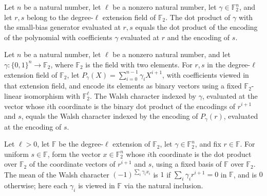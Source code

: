 \begin{theorem}
\leanok
{}
Let $n$ be a natural number, let $\ell$ be a nonzero natural number, let
$\gamma\in\mathbb F_2^n$, and let $r,s$ belong to the degree-$\ell$ extension field of
$\mathbb F_2$. The dot product of $\gamma$ with the small-bias generator evaluated at
$r,s$ equals the dot product of the encoding of the polynomial with coefficients
$\gamma$ evaluated at $r$ and the encoding of $s$.
\end{theorem}

\begin{theorem}
\label{FABL.vectorWalshCharacter_smallBiasGenerator}
\leanok
{}
Let $n$ be a natural number, let $\ell$ be a nonzero natural number, and let
$\gamma\colon \{0,1\}^n\to\mathbb F_2$, where $\mathbb F_2$ is the field with two
elements. For $r,s$ in the degree-$\ell$ extension field of $\mathbb F_2$, let
$P_\gamma(X)=\sum_{i=0}^{n-1}\gamma_iX^{i+1}$, with coefficients viewed in that
extension field, and encode its elements as binary vectors using a fixed $\mathbb
F_2$-linear isomorphism with $\mathbb F_2^\ell$. The Walsh character indexed by
$\gamma$, evaluated at the vector whose $i$th coordinate is the binary dot product of
the encodings of $r^{i+1}$ and $s$, equals the Walsh character indexed by the encoding
of $P_\gamma(r)$, evaluated at the encoding of $s$.
\end{theorem}

\begin{theorem}
\label{FABL.expect_smallBiasGenerator_fixed_first}
\leanok
{}
Let $\ell>0$, let $\mathbb{F}$ be the degree-$\ell$ extension of $\mathbb{F}_2$, let
$\gamma\in\mathbb{F}_2^n$, and fix $r\in\mathbb{F}$. For uniform $s\in\mathbb{F}$, form
the vector $x\in\mathbb{F}_2^n$ whose $i$th coordinate is the dot product over
$\mathbb{F}_2$ of the coordinate vectors of $r^{i+1}$ and $s$, using a fixed basis of
$\mathbb{F}$ over $\mathbb{F}_2$. The mean of the Walsh character $(-1)^{\sum_i\gamma_i
x_i}$ is $1$ if $\sum_i\gamma_i r^{i+1}=0$ in $\mathbb{F}$, and is $0$ otherwise; here
each $\gamma_i$ is viewed in $\mathbb{F}$ via the natural inclusion.
\end{theorem}

